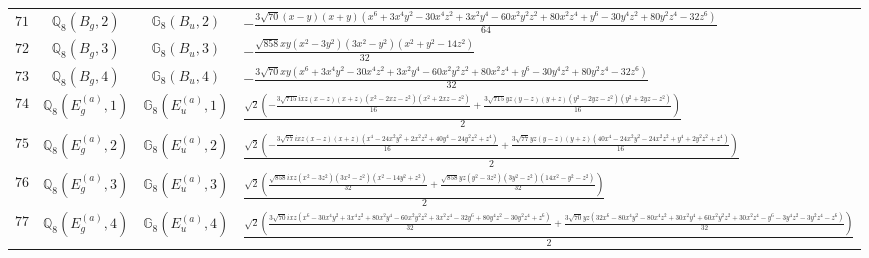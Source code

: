 \documentclass[fleqn,8pt,landscape]{jsarticle}
\begin{document}
\begin{table}[ht!]
\begin{center}
\begin{tabular}{cccl}
$ 71 $ & $ \mathbb{Q}_{8}(B_{g},2) $ & $ \mathbb{G}_{8}(B_{u},2) $ & $ - \frac{3 \sqrt{70} \left(x - y\right) \left(x + y\right) \left(x^{6} + 3 x^{4} y^{2} - 30 x^{4} z^{2} + 3 x^{2} y^{4} - 60 x^{2} y^{2} z^{2} + 80 x^{2} z^{4} + y^{6} - 30 y^{4} z^{2} + 80 y^{2} z^{4} - 32 z^{6}\right)}{64} $ \\
$ 72 $ & $ \mathbb{Q}_{8}(B_{g},3) $ & $ \mathbb{G}_{8}(B_{u},3) $ & $ - \frac{\sqrt{858} x y \left(x^{2} - 3 y^{2}\right) \left(3 x^{2} - y^{2}\right) \left(x^{2} + y^{2} - 14 z^{2}\right)}{32} $ \\
$ 73 $ & $ \mathbb{Q}_{8}(B_{g},4) $ & $ \mathbb{G}_{8}(B_{u},4) $ & $ - \frac{3 \sqrt{70} x y \left(x^{6} + 3 x^{4} y^{2} - 30 x^{4} z^{2} + 3 x^{2} y^{4} - 60 x^{2} y^{2} z^{2} + 80 x^{2} z^{4} + y^{6} - 30 y^{4} z^{2} + 80 y^{2} z^{4} - 32 z^{6}\right)}{32} $ \\
$ 74 $ & $ \mathbb{Q}_{8}(E_{g}^{(a)},1) $ & $ \mathbb{G}_{8}(E_{u}^{(a)},1) $ & $ \frac{\sqrt{2} \left(- \frac{3 \sqrt{715} i x z \left(x - z\right) \left(x + z\right) \left(x^{2} - 2 x z - z^{2}\right) \left(x^{2} + 2 x z - z^{2}\right)}{16} + \frac{3 \sqrt{715} y z \left(y - z\right) \left(y + z\right) \left(y^{2} - 2 y z - z^{2}\right) \left(y^{2} + 2 y z - z^{2}\right)}{16}\right)}{2} $ \\
$ 75 $ & $ \mathbb{Q}_{8}(E_{g}^{(a)},2) $ & $ \mathbb{G}_{8}(E_{u}^{(a)},2) $ & $ \frac{\sqrt{2} \left(- \frac{3 \sqrt{77} i x z \left(x - z\right) \left(x + z\right) \left(x^{4} - 24 x^{2} y^{2} + 2 x^{2} z^{2} + 40 y^{4} - 24 y^{2} z^{2} + z^{4}\right)}{16} + \frac{3 \sqrt{77} y z \left(y - z\right) \left(y + z\right) \left(40 x^{4} - 24 x^{2} y^{2} - 24 x^{2} z^{2} + y^{4} + 2 y^{2} z^{2} + z^{4}\right)}{16}\right)}{2} $ \\
$ 76 $ & $ \mathbb{Q}_{8}(E_{g}^{(a)},3) $ & $ \mathbb{G}_{8}(E_{u}^{(a)},3) $ & $ \frac{\sqrt{2} \left(\frac{\sqrt{858} i x z \left(x^{2} - 3 z^{2}\right) \left(3 x^{2} - z^{2}\right) \left(x^{2} - 14 y^{2} + z^{2}\right)}{32} + \frac{\sqrt{858} y z \left(y^{2} - 3 z^{2}\right) \left(3 y^{2} - z^{2}\right) \left(14 x^{2} - y^{2} - z^{2}\right)}{32}\right)}{2} $ \\
$ 77 $ & $ \mathbb{Q}_{8}(E_{g}^{(a)},4) $ & $ \mathbb{G}_{8}(E_{u}^{(a)},4) $ & $ \frac{\sqrt{2} \left(\frac{3 \sqrt{70} i x z \left(x^{6} - 30 x^{4} y^{2} + 3 x^{4} z^{2} + 80 x^{2} y^{4} - 60 x^{2} y^{2} z^{2} + 3 x^{2} z^{4} - 32 y^{6} + 80 y^{4} z^{2} - 30 y^{2} z^{4} + z^{6}\right)}{32} + \frac{3 \sqrt{70} y z \left(32 x^{6} - 80 x^{4} y^{2} - 80 x^{4} z^{2} + 30 x^{2} y^{4} + 60 x^{2} y^{2} z^{2} + 30 x^{2} z^{4} - y^{6} - 3 y^{4} z^{2} - 3 y^{2} z^{4} - z^{6}\right)}{32}\right)}{2} $ \\

\end{tabular}
\end{center}
\end{table}
\end{document}
